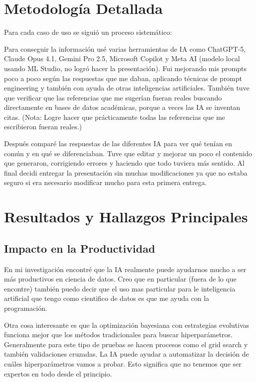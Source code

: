 \documentclass[11pt]{article}
\begin{document}
    \section*{Metodolog\'ia Detallada}

    Para cada caso de uso se sigui\'o un proceso sistem\'atico:

    Para conseguir la informaci\'on us\'e varias herramientas de IA como ChatGPT-5, Claude Opus 4.1, Gemini Pro 2.5, Microsoft Copilot y Meta AI (modelo local usando ML Studio, no logró hacer la presentación).
    Fui mejorando mis prompts poco a poco seg\'un las respuestas que me daban, aplicando t\'ecnicas de prompt engineering y también con ayuda de otras inteligencias artificiales.
    Tambi\'en tuve que verificar que las referencias que me suger\'ian fueran reales buscando directamente en bases de datos acad\'emicas, porque a veces las IA se inventan citas.
    (Nota: Logre hacer que pr\'acticamente todas las referencias que me escribieron fueran reales.)

    Despu\'es compar\'e las respuestas de las diferentes IA para ver qu\'e ten\'ian en com\'un y en qu\'e se diferenciaban.
    Tuve que editar y mejorar un poco el contenido que generaron, corrigiendo errores y haciendo que todo tuviera m\'as sentido.
    Al final decidi entregar la presentación sin muchas modificaciones ya que no estaba seguro si era necesario modificar mucho para esta primera entrega.

    \section*{Resultados y Hallazgos Principales}

    \subsection*{Impacto en la Productividad}

    En mi investigaci\'on encontr\'e que la IA realmente puede ayudarnos mucho a ser m\'as productivos en ciencia de datos.
    Creo que en particular (fuera de lo que encontre) también puedo decir que el uso mas particular para le inteligencia artificial que tengo como cientifico de datos es que me ayuda con la programación.

    Otra cosa interesante es que la optimizaci\'on bayesiana con estrategias evolutivas funciona mejor que los m\'etodos tradicionales para buscar hiperpar\'ametros.
    Generalmente para este tipo de pruebas se hacen procesos como el grid search y también validaciones cruzadas.
    La IA puede ayudar a automatizar la decisión de cu\'ales hiperpar\'ametros vamos a probar.
    Esto significa que no tenemos que ser expertos en todo desde el principio.
\end{document}
